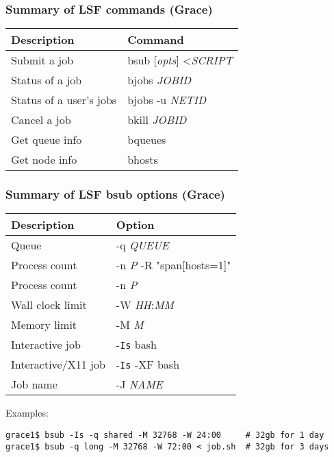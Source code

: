 \documentclass[10pt]{beamer}
\begin{document}
\begin{frame}
\frametitle{Summary of LSF commands (Grace)}
\begin{tabular}{|l|l|}
\hline
\textbf{Description} & \textbf{Command} \\
\hline
Submit a job & bsub [\textit{opts}] \textless \textit{SCRIPT} \\
\hline
Status of a job & bjobs \textit{JOBID} \\
\hline
Status of a user's jobs & bjobs -u \textit{NETID} \\
\hline
Cancel a job & bkill \textit{JOBID} \\
\hline
Get queue info & bqueues \\
\hline
Get node info & bhosts \\
\hline
\end{tabular}
\end{frame}

\begin{frame}[fragile]
\frametitle{Summary of LSF bsub options (Grace)}
\begin{tabular}{|l|l|}
\hline
\textbf{Description} & \textbf{Option} \\
\hline
Queue & -q \textit{QUEUE} \\
\hline
Process count & -n \textit{P} -R "span[hosts=1]" \\
\hline
Process count & -n \textit{P} \\
\hline
Wall clock limit & -W \textit{HH}:\textit{MM} \\
\hline
Memory limit & -M \textit{M} \\
\hline
Interactive job & -\texttt{Is} bash \\
\hline
Interactive/X11 job & -\texttt{Is} -XF bash \\
\hline
Job name & -J \textit{NAME} \\
\hline
\end{tabular}

\vskip10pt
Examples:
\begin{verbatim}
grace1$ bsub -Is -q shared -M 32768 -W 24:00     # 32gb for 1 day
grace1$ bsub -q long -M 32768 -W 72:00 < job.sh  # 32gb for 3 days
\end{verbatim}
\end{frame}
\end{document}
